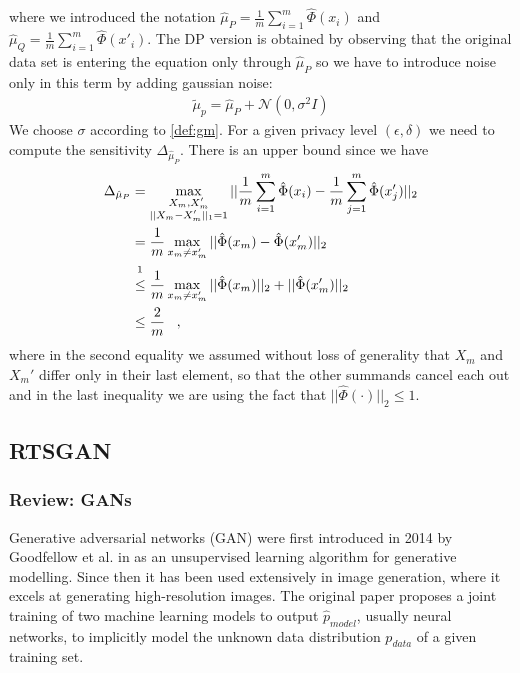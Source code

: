 where we introduced the notation $\hat{\mu}_P = \frac{1}{m} \sum_{i=1}^m \hat{\Phi}(x_i)$ and $\hat{\mu}_Q = \frac{1}{m} \sum_{i=1}^m \hat{\Phi}(x'_i)$. The DP version is obtained by observing that the original data set is entering the equation only through $\hat{\mu}_P$ so we have to introduce noise only in this term by adding gaussian noise:
\begin{align}
    \tilde{\mu}_p = \hat{\mu}_P + \mathcal{N}(0, \sigma^2 I)
\end{align}
We choose $\sigma$ according to \cref{def:gm}. For a given privacy level $(\epsilon, \delta)$ we need to compute the sensitivity $\Delta_{\hat{\mu}_P}$. There is an upper bound since we have
\begin{align}
    \Delta_{\hat{\mu}_P} &= \max_{\substack{X_m,X_m' \\ ||X_m-X_m'||_1=1}} || \frac{1}{m} \sum_{i=1}^m \hat{\Phi}(x_i) - \frac{1}{m} \sum_{j=1}^m \hat{\Phi}(x_j') ||_2 \nonumber \\
    &= \frac{1}{m} \max_{x_m \neq x'_m} || \hat{\Phi}(x_m) - \hat{\Phi}(x'_m)||_2 \nonumber \\
    &\overset{\footnotemark}{\leq} \frac{1}{m} \max_{x_m \neq x'_m} || \hat{\Phi}(x_m) ||_2 + ||\hat{\Phi}(x'_m)||_2 \nonumber \\
    &\leq \frac{2}{m} \mcomma
\end{align}
where in the second equality we assumed without loss of generality that $X_m$ and $X_m'$ differ only in their last element, so that the other summands cancel each out and in the last inequality we are using the fact that $||\hat{\Phi}(\cdot)||_2 \leq 1$.



\subsection{RTSGAN} 

\subsubsection{Review: GANs}
Generative adversarial networks (GAN) were first introduced in 2014 by Goodfellow et al. in \parencite{gan_og} as an unsupervised learning algorithm for generative modelling. Since then it has been used extensively in image generation, where it excels at generating high-resolution images. The original paper proposes a joint training of two machine learning models to output $\hat{p}_{model}$, usually neural networks, to implicitly model the unknown data distribution $p_{data}$ of a given training set. 

